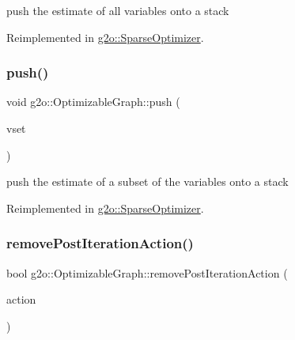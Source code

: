 push the estimate of all variables onto a stack 



Reimplemented in \mbox{\hyperlink{classg2o_1_1_sparse_optimizer_a4c121d69052291775860d06507aba698}{g2o\+::\+Sparse\+Optimizer}}.

\mbox{\label{structg2o_1_1_optimizable_graph_a1d65a6854936147a92f7ba664302993e}} 
\subsubsection{\texorpdfstring{push()}{push()}\hspace{0.1cm}{\footnotesize\ttfamily [2/2]}}
{\footnotesize\ttfamily void g2o\+::\+Optimizable\+Graph\+::push (\begin{DoxyParamCaption}\item[{\mbox{\hyperlink{classg2o_1_1_hyper_graph_a703938cdb4bb636860eed55a2489d70c}{Hyper\+Graph\+::\+Vertex\+Set}} \&}]{vset }\end{DoxyParamCaption})\hspace{0.3cm}{\ttfamily [virtual]}}



push the estimate of a subset of the variables onto a stack 



Reimplemented in \mbox{\hyperlink{classg2o_1_1_sparse_optimizer_ac9a5fd64764e61d99e8a90734118a8bf}{g2o\+::\+Sparse\+Optimizer}}.

\mbox{\label{structg2o_1_1_optimizable_graph_a172f2f5c8ec5872d5bc34077c6391839}} 
\subsubsection{\texorpdfstring{remove\+Post\+Iteration\+Action()}{removePostIterationAction()}}
{\footnotesize\ttfamily bool g2o\+::\+Optimizable\+Graph\+::remove\+Post\+Iteration\+Action (\begin{DoxyParamCaption}\item[{\mbox{\hyperlink{classg2o_1_1_hyper_graph_action}{Hyper\+Graph\+Action}} $\ast$}]{action }\end{DoxyParamCaption})}



